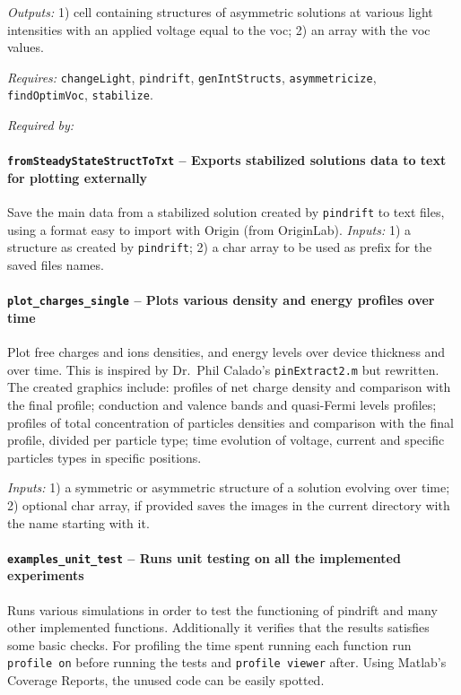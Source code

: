 		\textit{Outputs:} 1) cell containing structures of asymmetric solutions at various light
		     intensities with an applied voltage equal to the \gls{voc};
		2) an array with the \gls{voc} values.
		
		\textit{Requires:} \texttt{changeLight}, \texttt{pindrift}, \texttt{genIntStructs},
		   \texttt{asymmetricize}, \texttt{findOptimVoc}, \texttt{stabilize}.
		   
		\textit{Required by:} 
		
		\paragraph{\texttt{fromSteadyStateStructToTxt} -- Exports stabilized solutions data to text for plotting externally}
		Save the main data from a stabilized solution created by \texttt{pindrift} to text files, using a format easy to import with Origin (from OriginLab).
				\textit{Inputs:} 1) a structure as created by \texttt{pindrift};
				2) a char array to be used as prefix for the saved files names.




		\paragraph{\texttt{plot_charges_single} -- Plots various density and energy profiles over time}
Plot free charges and ions densities, and energy levels over device thickness and over time.
 This is inspired by Dr.\ Phil Calado's \texttt{pinExtract2.m} but rewritten.
 The created graphics include: profiles of net charge density and 
 comparison with the final profile; conduction and valence bands and 
 quasi-Fermi levels profiles; profiles of total concentration of 
 particles densities and comparison with the final profile, divided 
 per particle type; time evolution of voltage, current and specific 
 particles types in specific positions.

		\textit{Inputs:} 1) a symmetric or asymmetric structure of a solution evolving over time;
		2) optional char array, if provided saves the images in the current directory with the name starting with it.

		\paragraph{\texttt{examples_unit_test} -- Runs unit testing on all the implemented experiments}
Runs various simulations in order to test the functioning of pindrift and many other implemented functions.
Additionally it verifies that the results satisfies some basic checks.
 For profiling the time spent running each function run \texttt{profile on} before running the tests and \texttt{profile viewer} after.
 Using Matlab's Coverage Reports, the unused code can be easily spotted.

